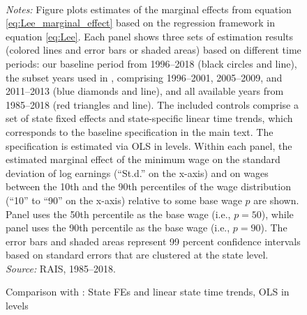 \begin{figure}[!htb]
  \centering
  \caption{Comparison with \citet{Haanwinckel2020_appendix}: State FEs and linear state time trends, OLS in levels\label{app_fig_haanwinckel_state_trend_1_ols_levels}}
  \prefigvspace
  \hspace*{\fill}%
  \centerhfill[\qquad\qquad\qquad\qquad\qquad]
  \hspace*{\fill}
  \\
  \postfigvspace
  \begin{minipage}[t]{1\columnwidth}%
    \begin{spacing}{0.75}
      \emph{\scriptsize{}Notes:}{\scriptsize{} Figure plots estimates of the marginal effects from equation \eqref{eq:Lee_marginal_effect} based on the regression framework in equation \eqref{eq:Lee}. Each panel shows three sets of estimation results (colored lines and error bars or shaded areas) based on different time periods: our baseline period from 1996--2018 (black circles and line), the subset years used in , comprising 1996--2001, 2005--2009, and 2011--2013 (blue diamonds and line), and all available years from 1985--2018 (red triangles and line). The included controls comprise a set of state fixed effects and state-specific linear time trends, which corresponds to the baseline specification in the main text. The specification is estimated via OLS in levels. Within each panel, the estimated marginal effect of the minimum wage on the standard deviation of log earnings (``St.d.'' on the x-axis) and on wages between the 10th and the 90th percentiles of the wage distribution (``10'' to ``90'' on the x-axis) relative to some base wage $p$ are shown. Panel  uses the 50th percentile as the base wage (i.e., $p=50$), while panel  uses the 90th percentile as the base wage (i.e., $p=90$). The error bars and shaded areas represent 99 percent confidence intervals based on standard errors that are clustered at the state level. %
      \emph{\scriptsize{}Source: } RAIS, 1985--2018.}
    \end{spacing}
  \end{minipage}
\end{figure}


